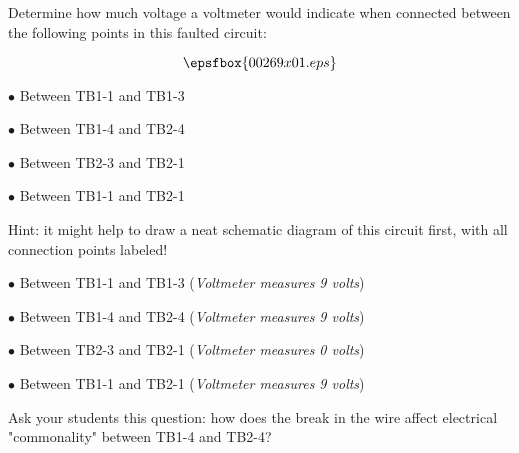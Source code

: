 

Determine how much voltage a voltmeter would indicate when connected between the following points in this faulted circuit:

$$\epsfbox{00269x01.eps}$$

\medskip
\item{$\bullet$} Between TB1-1 and TB1-3
\item{$\bullet$} Between TB1-4 and TB2-4
\item{$\bullet$} Between TB2-3 and TB2-1
\item{$\bullet$} Between TB1-1 and TB2-1
\medskip

Hint: it might help to draw a neat schematic diagram of this circuit first, with all connection points labeled!







\medskip
\item{$\bullet$} Between TB1-1 and TB1-3 ({\it Voltmeter measures 9 volts})
\item{$\bullet$} Between TB1-4 and TB2-4 ({\it Voltmeter measures 9 volts})
\item{$\bullet$} Between TB2-3 and TB2-1 ({\it Voltmeter measures 0 volts})
\item{$\bullet$} Between TB1-1 and TB2-1 ({\it Voltmeter measures 9 volts})
\medskip







Ask your students this question: how does the break in the wire affect electrical "commonality" between TB1-4 and TB2-4?




